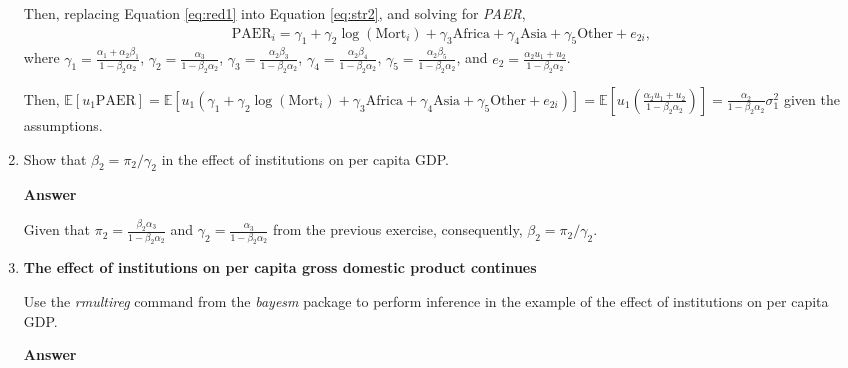 \begin{enumerate}[leftmargin=*]
Then, replacing Equation \ref{eq:red1} into Equation \ref{eq:str2}, and solving for \textit{PAER},
\begin{align}\label{eq:red2}
	\text{PAER}_i=\gamma_1+\gamma_2\log(\text{Mort}_i)+\gamma_3 \text{Africa}+\gamma_4 \text{Asia}+\gamma_5 \text{Other}+e_{2i},
\end{align}
where $\gamma_1=\frac{\alpha_1+\alpha_2\beta_1}{1-\beta_2\alpha_2}$, $\gamma_2=\frac{\alpha_3}{1-\beta_2\alpha_2}$, $\gamma_3=\frac{\alpha_2\beta_3}{1-\beta_2\alpha_2}$, $\gamma_4=\frac{\alpha_2\beta_4}{1-\beta_2\alpha_2}$,
$\gamma_5=\frac{\alpha_2\beta_5}{1-\beta_2\alpha_2}$, and $e_2=\frac{\alpha_2u_1+u_2}{1-\beta_2\alpha_2}$.

Then, $\mathbb{E}[u_1\text{PAER}]=\mathbb{E}\left[u_1(\gamma_1+\gamma_2\log(\text{Mort}_i)+\gamma_3 \text{Africa}+\gamma_4 \text{Asia}+\gamma_5 \text{Other}+e_{2i})\right]=\mathbb{E}\left[u_1\left(\frac{\alpha_2u_1+u_2}{1-\beta_2\alpha_2}\right)\right]=\frac{\alpha_2}{1-\beta_2\alpha_2}\sigma^2_1$ given the assumptions.      

\item Show that $\beta_2=\pi_2/\gamma_2$ in the effect of institutions on per capita GDP.

\textbf{Answer}

Given that $\pi_2=\frac{\beta_2\alpha_3}{1-\beta_2\alpha_2}$ and $\gamma_2=\frac{\alpha_3}{1-\beta_2\alpha_2}$ from the previous exercise, consequently, $\beta_2=\pi_2/\gamma_2$.

\item \textbf{The effect of institutions on per capita gross domestic product continues}

Use the \textit{rmultireg} command from the \textit{bayesm} package to perform inference in the example of the effect of institutions on per capita GDP.

\textbf{Answer}


\end{enumerate}
